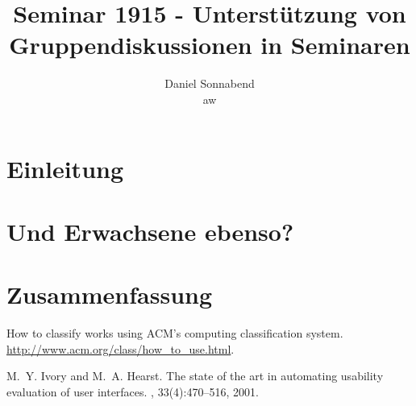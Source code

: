 \documentclass{seminarvorlage}
\begin{document}
\title{Seminar 1915 - Unterstützung von Gruppendiskussionen in Seminaren}
\author{
  \alignauthor Daniel Sonnabend\\
  \alignauthor aw\\
}

\maketitle



\section{Einleitung}

\section{Und Erwachsene ebenso?}

\section{Zusammenfassung}


\begin{thebibliography}{9}
How to classify works using ACM's computing classification system.
\newblock \url{http://www.acm.org/class/how_to_use.html}.

M.~Y. Ivory and M.~A. Hearst.
\newblock The state of the art in automating usability evaluation of user
  interfaces.
, 33(4):470--516, 2001.

\end{thebibliography}
\end{document}
